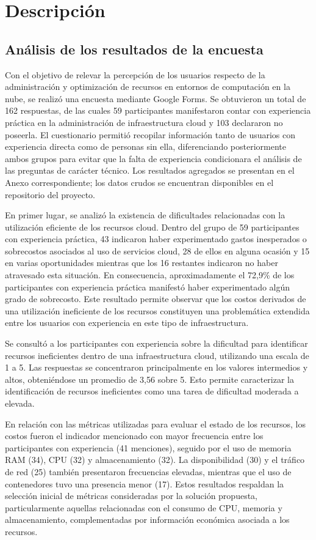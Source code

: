 \chapter{Descripción}

\section{Análisis de los resultados de la encuesta}

Con el objetivo de relevar la percepción de los usuarios respecto de la administración y optimización de recursos en entornos de computación en la nube, se realizó una encuesta mediante Google Forms. Se obtuvieron un total de 162 respuestas, de las cuales 59 participantes manifestaron contar con experiencia práctica en la administración de infraestructura cloud y 103 declararon no poseerla. El cuestionario permitió recopilar información tanto de usuarios con experiencia directa como de personas sin ella, diferenciando posteriormente ambos grupos para evitar que la falta de experiencia condicionara el análisis de las preguntas de carácter técnico. Los resultados agregados se presentan en el Anexo correspondiente; los datos crudos se encuentran disponibles en el repositorio del proyecto.

En primer lugar, se analizó la existencia de dificultades relacionadas con la utilización eficiente de los recursos cloud. Dentro del grupo de 59 participantes con experiencia práctica, 43 indicaron haber experimentado gastos inesperados o sobrecostos asociados al uso de servicios cloud, 28 de ellos en alguna ocasión y 15 en varias oportunidades mientras que los 16 restantes indicaron no haber atravesado esta situación. En consecuencia, aproximadamente el 72,9\% de los participantes con experiencia práctica manifestó haber experimentado algún grado de sobrecosto. Este resultado permite observar que los costos derivados de una utilización ineficiente de los recursos constituyen una problemática extendida entre los usuarios con experiencia en este tipo de infraestructura.

Se consultó a los participantes con experiencia sobre la dificultad para identificar recursos ineficientes dentro de una infraestructura cloud, utilizando una escala de 1 a 5. Las respuestas se concentraron principalmente en los valores intermedios y altos, obteniéndose un promedio de 3,56 sobre 5. Esto permite caracterizar la identificación de recursos ineficientes como una tarea de dificultad moderada a elevada.

En relación con las métricas utilizadas para evaluar el estado de los recursos, los costos fueron el indicador mencionado con mayor frecuencia entre los participantes con experiencia (41 menciones), seguido por el uso de memoria RAM (34), CPU (32) y almacenamiento (32). La disponibilidad (30) y el tráfico de red (25) también presentaron frecuencias elevadas, mientras que el uso de contenedores tuvo una presencia menor (17). Estos resultados respaldan la selección inicial de métricas consideradas por la solución propuesta, particularmente aquellas relacionadas con el consumo de CPU, memoria y almacenamiento, complementadas por información económica asociada a los recursos.

